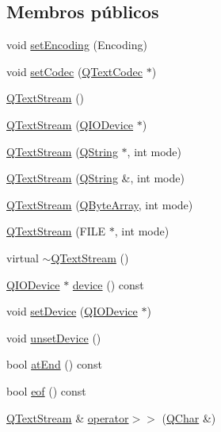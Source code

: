 \subsection*{Membros públicos}
\begin{DoxyCompactItemize}
\item 
void \hyperlink{class_q_text_stream_a0dcb70ff23e690c42a8c52280fa39d78}{set\-Encoding} (Encoding)
\item 
void \hyperlink{class_q_text_stream_a8a99d406850292fd277366f67c365937}{set\-Codec} (\hyperlink{class_q_text_codec}{Q\-Text\-Codec} $\ast$)
\item 
\hyperlink{class_q_text_stream_a72ac2df4053474b0503650b38a97d98d}{Q\-Text\-Stream} ()
\item 
\hyperlink{class_q_text_stream_a0de861c66d51a0b632de68d245bc3d16}{Q\-Text\-Stream} (\hyperlink{class_q_i_o_device}{Q\-I\-O\-Device} $\ast$)
\item 
\hyperlink{class_q_text_stream_a397cb3b9871c5245e7e7a7835c9bdbad}{Q\-Text\-Stream} (\hyperlink{class_q_string}{Q\-String} $\ast$, int mode)
\item 
\hyperlink{class_q_text_stream_a3e570b90bce8018a6bbf77e0fbec1932}{Q\-Text\-Stream} (\hyperlink{class_q_string}{Q\-String} \&, int mode)
\item 
\hyperlink{class_q_text_stream_a6ce828b404e46ad8541c67938e62cfce}{Q\-Text\-Stream} (\hyperlink{class_q_array}{Q\-Byte\-Array}, int mode)
\item 
\hyperlink{class_q_text_stream_aab79580d43a641bd165f3ad570630199}{Q\-Text\-Stream} (F\-I\-L\-E $\ast$, int mode)
\item 
virtual \hyperlink{class_q_text_stream_a5b6ffaf52610d2db83029e832c748f0a}{$\sim$\-Q\-Text\-Stream} ()
\item 
\hyperlink{class_q_i_o_device}{Q\-I\-O\-Device} $\ast$ \hyperlink{class_q_text_stream_a18846d79bf14c21d749e27eef80bb6a0}{device} () const 
\item 
void \hyperlink{class_q_text_stream_a98230cf62c8603a7d0706e3044030f1b}{set\-Device} (\hyperlink{class_q_i_o_device}{Q\-I\-O\-Device} $\ast$)
\item 
void \hyperlink{class_q_text_stream_aa6b00e03249023ce66f02861f5a6ffae}{unset\-Device} ()
\item 
bool \hyperlink{class_q_text_stream_a11cbf4ba82ee565cb9eef28b972bf145}{at\-End} () const 
\item 
bool \hyperlink{class_q_text_stream_ac4bcdb9a2c4adf5c3d247a711a7142cc}{eof} () const 
\item 
\hyperlink{class_q_text_stream}{Q\-Text\-Stream} \& \hyperlink{class_q_text_stream_a9287981cc342cff5dcb35c7c3774eb69}{operator$>$$>$} (\hyperlink{class_q_char}{Q\-Char} \&)

\end{DoxyCompactItemize}
